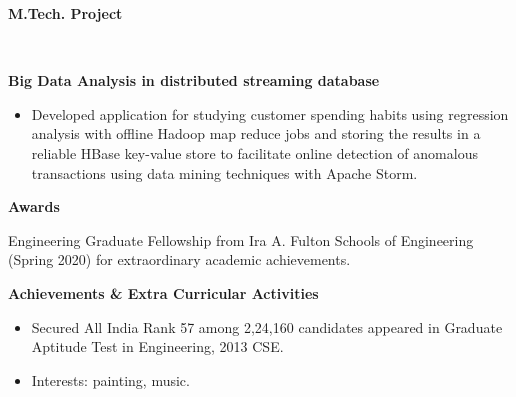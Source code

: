 \documentclass[a4paper,11pt]{article}
\newcommand{\lsep}{-0.5cm}
\newcommand{\resheading}[1]{{\small \colorbox{mygrey}{\begin{minipage}{0.975\textwidth}{\textbf{#1 \vphantom{p\^{E}}}}\end{minipage}}}}
\begin{document}
	\resheading{\textbf{\large M.Tech. Project} }\\[\lsep]
	\begin{description}
		\item \hspace{0.65 cm} \textbf{Big Data Analysis in distributed streaming database}
		\begin{itemize}
			\item Developed application for studying customer spending habits using regression analysis with offline Hadoop map reduce jobs and storing the results in a reliable HBase key-value store to facilitate online detection of anomalous transactions using data mining techniques with Apache Storm. 
			
			
		\end{itemize}
		
	\end{description}
	
	
	\resheading{\textbf{\large Awards}}
	\begin{description}
		\item \hspace{0.65 cm} Engineering Graduate Fellowship from Ira A. Fulton Schools of Engineering (Spring 2020) for extraordinary academic achievements.
		
	\end{description}
	
	\resheading{\textbf{\large Achievements \& Extra Curricular Activities }}
	
	\begin{description}
		\item
		\begin{itemize}
			\item Secured All India Rank 57 among 2,24,160 candidates appeared in Graduate Aptitude Test in Engineering, 2013 CSE.
		\end{itemize}
		\item
		\begin{itemize}
			\item Interests: painting, music.
		\end{itemize}
	\end{description}
	
\end{document}

